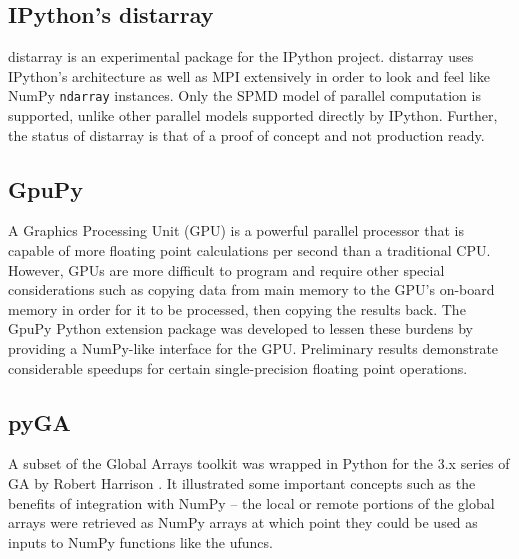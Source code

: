 \documentclass[preprint]{sigplanconf}
\begin{document}
\subsection{IPython's distarray}

distarray \cite{Per09} is an experimental package for the IPython project.
distarray uses IPython’s architecture as well as MPI extensively in order to
look and feel like NumPy \verb=ndarray= instances. Only the SPMD model of
parallel computation is supported, unlike other parallel models supported
directly by IPython.  Further, the status of distarray is that of a proof of
concept and not production ready.

\subsection{GpuPy}

A Graphics Processing Unit (GPU) is a powerful parallel processor that is
capable of more floating point calculations per second than a traditional CPU.
However, GPUs are more difficult to program and require other special
considerations such as copying data from main memory to the GPU’s on-board
memory in order for it to be processed, then copying the results back. The
GpuPy \cite{Eit07} Python extension package was developed to lessen these
burdens by providing a NumPy-like interface for the GPU. Preliminary results
demonstrate considerable speedups for certain single-precision floating point
operations.

\subsection{pyGA}

A subset of the Global Arrays toolkit was wrapped in Python for the 3.x series
of GA by Robert Harrison \cite{Har99}. It illustrated some important concepts
such as the benefits of integration with NumPy -- the local or remote portions
of the global arrays were retrieved as NumPy arrays at which point they could
be used as inputs to NumPy functions like the ufuncs.

\end{document}

